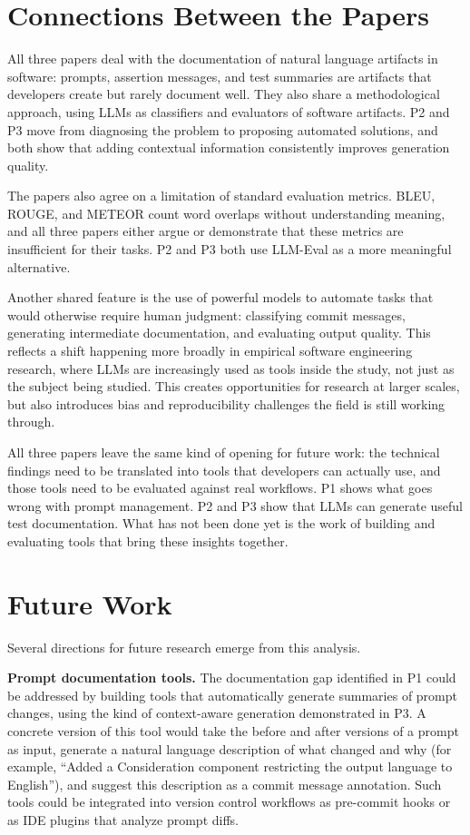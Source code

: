\documentclass[
    pdftex,
    final,
    11pt,
    a4paper,
    parskip=false,
    oneside,
    footheight=0mm,
    footinclude=false,
    toc=bibliography
]{scrbook}
\begin{document}
\section{Connections Between the Papers}

All three papers deal with the documentation of natural language artifacts in software: prompts, assertion messages, and test summaries are artifacts that developers create but rarely document well. They also share a methodological approach, using LLMs as classifiers and evaluators of software artifacts. P2 and P3 move from diagnosing the problem to proposing automated solutions, and both show that adding contextual information consistently improves generation quality.

The papers also agree on a limitation of standard evaluation metrics. BLEU, ROUGE, and METEOR count word overlaps without understanding meaning, and all three papers either argue or demonstrate that these metrics are insufficient for their tasks. P2 and P3 both use LLM-Eval as a more meaningful alternative.

Another shared feature is the use of powerful models to automate tasks that would otherwise require human judgment: classifying commit messages, generating intermediate documentation, and evaluating output quality. This reflects a shift happening more broadly in empirical software engineering research, where LLMs are increasingly used as tools inside the study, not just as the subject being studied. This creates opportunities for research at larger scales, but also introduces bias and reproducibility challenges the field is still working through.

All three papers leave the same kind of opening for future work: the technical findings need to be translated into tools that developers can actually use, and those tools need to be evaluated against real workflows. P1 shows what goes wrong with prompt management. P2 and P3 show that LLMs can generate useful test documentation. What has not been done yet is the work of building and evaluating tools that bring these insights together.

\section{Future Work}

Several directions for future research emerge from this analysis.

\textbf{Prompt documentation tools.} The documentation gap identified in P1 could be addressed by building tools that automatically generate summaries of prompt changes, using the kind of context-aware generation demonstrated in P3. A concrete version of this tool would take the before and after versions of a prompt as input, generate a natural language description of what changed and why (for example, ``Added a Consideration component restricting the output language to English''), and suggest this description as a commit message annotation. Such tools could be integrated into version control workflows as pre-commit hooks or as IDE plugins that analyze prompt diffs.
\end{document}
